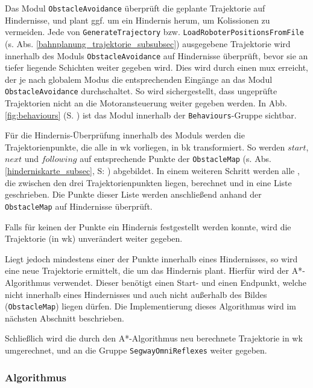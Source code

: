 Das Modul \lstinline{ObstacleAvoidance} überprüft die geplante Trajektorie auf Hindernisse, und plant ggf. um ein Hindernis herum, um Kolissionen zu vermeiden.
Jede von \lstinline{GenerateTrajectory} bzw. \lstinline{LoadRoboterPositionsFromFile} (s. Abs. \ref{bahnplanung_trajektorie_subsubsec}) ausgegebene Trajektorie wird innerhalb des Moduls \lstinline{ObstacleAvoidance} auf Hindernisse überprüft, bevor sie an tiefer liegende Schichten weiter gegeben wird.
Dies wird durch einen \gls{mux} erreicht, der je nach globalem Modus die entsprechenden Eingänge an das Modul \lstinline{ObstacleAvoidance} durchschaltet.
So wird sichergestellt, dass ungeprüfte Trajektorien nicht an die Motoransteuerung weiter gegeben werden.
In Abb. \ref{fig:behaviours} (S. \pageref{fig:behaviours}) ist das Modul innerhalb der \lstinline{Behaviours}-Gruppe sichtbar.

Für die Hindernis-Überprüfung innerhalb des Moduls werden die Trajektorienpunkte, die alle in \gls{wk} vorliegen, in \gls{bk} transformiert.
So werden $start$, $next$ und $following$ auf entsprechende Punkte der \lstinline{ObstacleMap} (s. Abs. \ref{hinderniskarte_subsec}, S: \pageref{hinderniskarte_subsec}) abgebildet.
In einem weiteren Schritt werden alle , die zwischen den drei Trajektorienpunkten liegen, berechnet und in eine Liste geschrieben.
Die Punkte dieser Liste werden anschließend anhand der \lstinline{ObstacleMap} auf Hindernisse überprüft.

Falls für keinen der Punkte ein Hindernis festgestellt werden konnte, wird die Trajektorie (in \gls{wk}) unverändert weiter gegeben.

Liegt jedoch mindestens einer der Punkte innerhalb eines Hindernisses, so wird eine neue Trajektorie ermittelt, die um das Hindernis plant.
Hierfür wird der A*-Algorithmus verwendet.
Dieser benötigt einen Start- und einen Endpunkt, welche nicht innerhalb eines Hindernisses und auch nicht außerhalb des Bildes (\lstinline{ObstacleMap}) liegen dürfen.
Die Implementierung dieses Algorithmus wird im nächsten Abschnitt beschrieben.

Schließlich wird die durch den A*-Algorithmus neu berechnete Trajektorie in \gls{wk} umgerechnet, und an die Gruppe \lstinline{SegwayOmniReflexes} weiter gegeben.



\subsubsection{Algorithmus}
\authorsection{\editorjulian}

